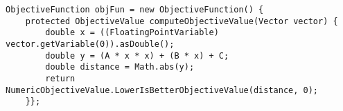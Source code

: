 \verb$ObjectiveFunction objFun = new ObjectiveFunction() {                          $\\
\verb$    protected ObjectiveValue computeObjectiveValue(Vector vector) {           $\\
\verb$        double x = ((FloatingPointVariable) vector.getVariable(0)).asDouble();$\\
\verb$        double y = (A * x * x) + (B * x) + C;                                 $\\
\verb$        double distance = Math.abs(y);                                        $\\
\verb$        return NumericObjectiveValue.LowerIsBetterObjectiveValue(distance, 0);$\\
\verb$    }};                                                                       $\\